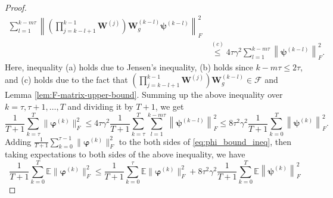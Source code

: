 \documentclass{article}
\newcommand{\vphi}{\bm{\varphi}}
\newcommand{\vpsi}{\bm{\psi}}
\newcommand{\vW}{\mathbf{W}}
\newcommand{\ko}{{(k)}}
\newcommand{\bbE}{\mathbb{E}}
\newcommand{\avekT}{\frac{1}{T+1}\sum_{k=0}^T}
\theoremstyle{plain}
\theoremstyle{definition}
\begin{document}
\begin{proof}
\begin{align*}
\sum_{l=1}^{k-m\tau}\left\|\left(\prod_{j=k-l+1}^{k-1}\vW^{(j)}\right)\vW^{(k-l)}_g\vpsi^{(k-l)}\right\|^2_F\\
&\stackrel{(c)}{\leq}
4\tau\gamma^2
\sum_{l=1}^{k-m\tau}\left\|\vpsi^{(k-l)}\right\|^2_F.
\end{align*}
Here, inequality (a) holds due to Jensen's inequality,  (b) holds since $k-m\tau \le 2 \tau$, and (c) holds due to the fact that $\left(\prod_{j=k-l+1}^{k-1}\vW^{(j)}\right)\vW^{(k-l)}_g \in \mathscr{F}$ and Lemma \ref{lem:F-matrix-upper-bound}.  Summing up the above inequality over $k=\tau,\tau+1,\ldots,T$ and dividing it by $T+1$, we get
\begin{equation}
\label{eq:phi_bound_ineq}
\frac{1}{T+1}\sum_{k=\tau}^T \|\vphi^\ko\|^2_F\leq
4\tau\gamma^2
\frac{1}{T+1}\sum_{k=\tau}^T\sum_{l=1}^{k-m\tau}\left\|\vpsi^{(k-l)}\right\|^2_F
\leq 8\tau^2\gamma^2
\avekT\left\|\vpsi^{(k)}\right\|^2_F.
\end{equation}
{Adding $\frac{1}{T+1}\sum_{k=0}^{\tau-1}\|\vphi^\ko\|_F^2$ to the both sides of \eqref{eq:phi_bound_ineq}, } then taking expectations to both sides of the above inequality, we have
\begin{equation}
\label{eq:ave-sq-phi}
\avekT \bbE\|\vphi^\ko\|^2_F
\leq \frac{1}{T+1}\sum_{k=0}^\tau\bbE\|\vphi^\ko\|^2_F+8\tau^2\gamma^2\avekT\bbE\left\|\vpsi^{(k)}\right\|^2_F
\end{equation}


\end{proof}
\end{document}
